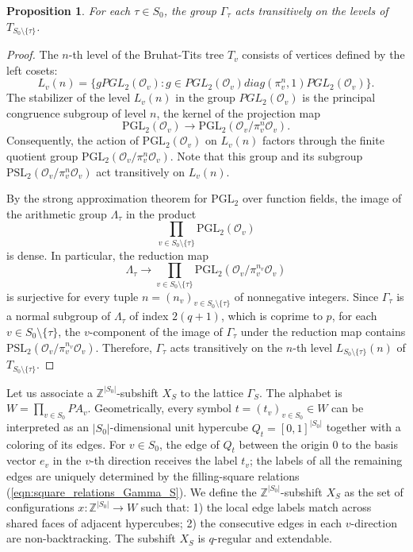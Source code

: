\documentclass[12pt]{article}
\newtheorem{proposition}[theorem]{Proposition}
\theoremstyle{definition}
\begin{document}
\begin{proposition}\label{prop:graphs are connected}
For each $\tau\in S_0$, the group $\Gamma_\tau$ acts transitively on the levels of $T_{S_0\setminus \{\tau\} }$.
\end{proposition}
\begin{proof}
The $n$-th level of the Bruhat-Tits tree $T_v$ consists of vertices defined by the left cosets:
\[
L_v(n)=\{ gPGL_2(\mathcal{O}_v) : g\in PGL_2(\mathcal{O}_v) diag(\pi_v^n,1)PGL_2(\mathcal{O}_v) \}.
\]
The stabilizer of the level $L_v(n)$ in the group $PGL_2(\mathcal{O}_v)$ is the principal congruence subgroup of level $n$, the kernel of the projection map
\[
\text{PGL}_2(\mathcal{O}_v) \rightarrow \text{PGL}_2(\mathcal{O}_v/\pi_v^n\mathcal{O}_v).
\]
Consequently, the action of $\text{PGL}_2(\mathcal{O}_v)$ on $L_v(n)$ factors through the finite quotient group $\text{PGL}_2(\mathcal{O}_v/\pi_v^n\mathcal{O}_v)$. Note that this group and its subgroup $\text{PSL}_2(\mathcal{O}_v/\pi_v^n\mathcal{O}_v)$ act transitively on $L_v(n)$.

By the strong approximation theorem for $\mathrm{PGL}_2$ over function fields, the image of the arithmetic group $\Lambda_\tau$ in the product
\[
\prod_{v \in S_0\setminus\{\tau\}} \mathrm{PGL}_2(\mathcal{O}_{v})
\]
is dense. In particular, the reduction map
\[
\Lambda_\tau \longrightarrow \prod_{v \in S_0\setminus\{\tau\}} \mathrm{PGL}_2(\mathcal{O}_{v}/\pi_v^{n_v}\mathcal{O}_{v})
\]
is surjective for every tuple $n=(n_v)_{v\in S_0\setminus\{\tau\}}$ of nonnegative integers. Since $\Gamma_\tau$ is a normal subgroup of $\Lambda_\tau$ of index $2(q+1)$, which is coprime to $p$, for each $v\in S_0\setminus\{\tau\}$, the $v$-component of the image of $\Gamma_\tau$ under the reduction map contains $\mathrm{PSL}_2(\mathcal{O}_{v}/\pi_v^{n_v}\mathcal{O}_{v})$. Therefore, $\Gamma_\tau$ acts transitively on the $n$-th level $L_{S_0\setminus\{\tau\}}(n)$ of $T_{S_0\setminus\{\tau\}}$.
\end{proof}

Let us associate a $\mathbb{Z}^{|S_0|}$-subshift $X_{S}$ to the lattice $\Gamma_{S}$. The alphabet is $W=\prod_{v\in S_0} PA_v$. Geometrically, every symbol $t=(t_v)_{v\in S_0}\in W$ can be interpreted as an $|S_0|$-dimensional unit hypercube $Q_t=[0,1]^{|S_0|}$ together with a coloring of its edges. For $v\in S_0$, the edge of $Q_t$ between the origin $0$ to the basis vector $e_v$ in the $v$-th direction receives the label $t_v$; the labels of all the remaining edges are uniquely determined by the filling-square relations (\ref{eqn:square_relations_Gamma_S}).
We define the $\mathbb{Z}^{|S_0|}$-subshift $X_{S}$ as the set of configurations $x:\mathbb{Z}^{|S_0|}\rightarrow W$ such that: 1) the local edge labels match across shared faces of adjacent hypercubes; 2) the consecutive edges in each $v$-direction are non-backtracking. The subshift $X_{S}$ is $q$-regular and extendable.
\end{document}

